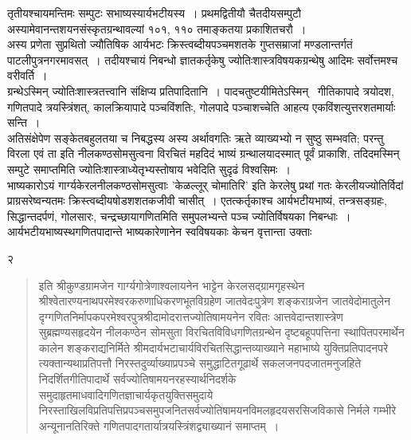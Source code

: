 \documentclass[11pt, openany]{book}
\begin{document}
तृतीयश्चायमन्तिमः सम्पुटः सभाष्यस्यार्यभटीयस्य~। प्रथमद्वितीयौ चैतदीयसम्पुटौ अस्यामेवानन्तशयनसंस्कृतग्रन्थावल्यां १०१, ११०
तमाङ्कतया प्रकाशितचरौ~।\\

अस्य प्रणेता सुप्रथितो ज्यौतिषिक आर्यभटः क्रिस्त्वब्दीयपञ्चमशतके गुप्तसम्राजां मण्डलान्तर्गतं पाटलीपुत्रनगरमावसत्~। तदीयश्चायं निबन्धो ज्ञातकर्तृकेषु ज्योतिःशास्त्रविषयकग्रन्थेषु आदिमः सर्वोत्तमश्च वरीवर्ति~। \\

ग्रन्थेऽस्मिन् ज्योतिःशास्त्रतत्त्वानि संक्षिप्य प्रतिपादितानि~। पादचतुष्टयीमितेऽस्मिन् \textendash\ गीतिकापादे त्रयोदश, गणितपादे त्रयस्त्रिंशत्, कालक्रियापादे पञ्चविंशतिः, गोलपादे पञ्चाशच्चेति आहत्य एकविंशत्युत्तरशतमार्याः सन्ति~।\\

अतिसंक्षेपेण सङ्केतबहुलतया च निबद्धस्य अस्य अर्थावगतिः ऋते व्याख्यभ्यो न सुष्ठु सम्भवति; परन्तु विरला एवं ता इति
नीलकण्ठसोमसुत्वना विरचितं महदिदं भाष्यं ग्रन्थालयादस्मात् पूर्वं प्राकाशि, तदिदमस्मिन् सम्पुटे समाप्तमिति ज्योतिःशास्त्राध्येतृभ्यस्तोषाय भवेदिति सुदृढं विश्वसिमः~। \\

भाष्यकारोऽयं गार्ग्यकेरलनीलकण्ठसोमसुत्वाः 'केळल्लूर् चोमातिरि' इति केरलेषु प्रथां गतः केरलीयज्योतिर्विदां प्राग्रसरेष्वन्यतमः क्रिस्त्वब्दीयषोडशशतकजीवी चासीत्~। एतत्कर्तृकाश्च आर्यभटीयभाष्यं, तन्त्रसङ्ग्रहः, 
सिद्धान्तदर्पणं, गोलसारः, चन्द्रच्छायागणितमिति समुपलभ्यन्ते पञ्च ज्योतिर्विषयका निबन्धाः~। आर्यभटीयभाष्यस्थगणितपादान्ते भाष्यकारेणानेन
स्वविषयकाः केचन वृत्तान्ता उक्ताः\textendash 
\newpage
\thispagestyle{empty}
\begin{center} २\\ \end{center}
\begin{sloppypar} 
\begin{quote} 
	इति श्रीकुण्डग्रामजेन
	गार्ग्यगोत्रेणाश्वलायनेन भाट्टेन केरलसद्ग्रामगृहस्थेन श्रीश्वेतारण्यनाथपरमेश्वरकरुणाधिकरणभूतविग्रहेण 
	जातवेदःपुत्रेण शङ्कराग्रजेन जातवेदोमातुलेन दृग्गणितनिर्मापकपरमेश्वरपुत्रश्रीदामोदरात्तज्योतिषामयनेन रवितः आत्तवेदान्तशास्त्रेण सुब्रह्मण्यसहृदयेन नीलकण्ठेन सोमसुता विरचितविविधगणितग्रन्थेन दृष्टबहूपपत्तिना स्थापितपरमार्थेन कालेन शङ्कराद्यनिर्मिते श्रीमदार्यभटाचार्यविरचितसिद्धान्तव्याख्याने महाभाष्ये युक्तिप्रतिपादनपरे त्यक्तान्यथाप्रतिपत्तौ निरस्तदुर्व्याख्याप्रपञ्चे समुद्धाटितगूढार्थे सकलजनपदजातमनुजहिते निदर्शितगीतिपादार्थे सर्वज्योतिषामयनरहस्यार्थनिदर्शके समुदाहृतमाधवादिगणितज्ञाचार्यकृतयुक्तिसमुदाये
	निरस्ताखिलविप्रतिपत्तिप्रपञ्चसमुपजनितसर्वज्योतिषामयनविमलहृदयसरसिजविकासे निर्मले गम्भीरे अन्यूनानतिरिक्ते 
	गणितपादगतार्यात्रयस्त्रिंशद्व्याख्यानं समाप्तम्~। 
\end{quote} 
\end{sloppypar} 
\end{document}
